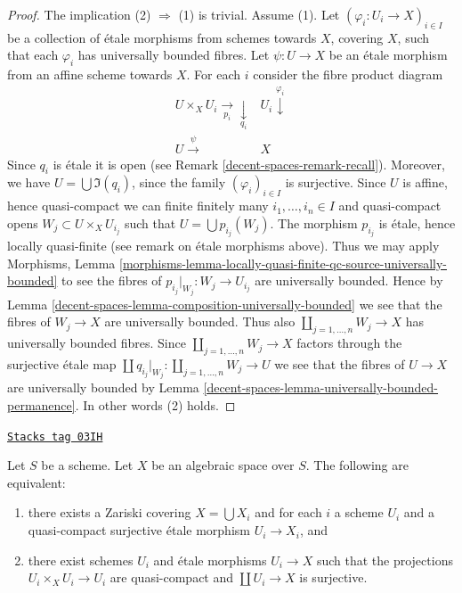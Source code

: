 \begin{proof}
The implication (2) $\Rightarrow$ (1) is trivial.
Assume (1). Let $(\varphi_i : U_i \to X)_{i \in I}$ be a collection of
\'etale morphisms from schemes towards $X$, covering $X$, such that
each $\varphi_i$ has universally bounded fibres.
Let $\psi : U \to X$ be an \'etale morphism from an affine scheme towards $X$.
For each $i$ consider the fibre product diagram
$$
\begin{array}{cc}U \times_X U_i \underset{p_i}{\longrightarrow}\underset{q_i}{\downarrow} & U_i \overset{\varphi_i}{\downarrow} \\ U \overset{\psi}{\longrightarrow} & X\end{array}
$$
Since $q_i$ is \'etale it is open (see Remark \ref{decent-spaces-remark-recall}).
Moreover, we have $U = \bigcup \Im(q_i)$, since the family
$(\varphi_i)_{i \in I}$ is surjective. Since $U$ is affine, hence quasi-compact
we can finite finitely many $i_1, \ldots, i_n \in I$ and quasi-compact
opens $W_j \subset U \times_X U_{i_j}$ such that
$U = \bigcup p_{i_j}(W_j)$.
The morphism $p_{i_j}$ is \'etale, hence locally quasi-finite
(see remark on \'etale morphisms above). Thus we may apply
Morphisms, Lemma
\ref{morphisms-lemma-locally-quasi-finite-qc-source-universally-bounded}
to see the fibres of $p_{i_j}|_{W_j} : W_j \to U_{i_j}$ are universally
bounded. Hence by
Lemma \ref{decent-spaces-lemma-composition-universally-bounded}
we see that the fibres of $W_j \to X$ are universally bounded.
Thus also $\coprod_{j = 1, \ldots, n} W_j \to X$ has universally
bounded fibres. Since $\coprod_{j = 1, \ldots, n} W_j \to X$ factors
through the surjective \'etale map
$\coprod q_{i_j}|_{W_j} : \coprod_{j = 1, \ldots, n} W_j \to U$ we
see that the fibres of $U \to X$ are universally bounded by
Lemma \ref{decent-spaces-lemma-universally-bounded-permanence}.
In other words (2) holds.
\end{proof}

\begin{lemma}
\label{decent-spaces-lemma-characterize-very-reasonable}
\href{https://stacks.math.columbia.edu/tag/03IH}{\texttt{Stacks tag 03IH}}

Let $S$ be a scheme.
Let $X$ be an algebraic space over $S$.
The following are equivalent:
\begin{enumerate}
\item there exists a Zariski covering $X = \bigcup X_i$ and for
each $i$ a scheme $U_i$ and a quasi-compact surjective \'etale
morphism $U_i \to X_i$, and
\item there exist schemes $U_i$ and \'etale morphisms $U_i \to X$
such that the projections $U_i \times_X U_i \to U_i$ are quasi-compact
and $\coprod U_i \to X$ is surjective.
\end{enumerate}
\end{lemma}

